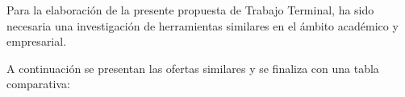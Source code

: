 Para la elaboración de la presente propuesta de Trabajo Terminal, ha sido necesaria una investigación de herramientas similares en el ámbito académico y empresarial.


A continuación se presentan las ofertas similares y se finaliza con una tabla comparativa: 





%


